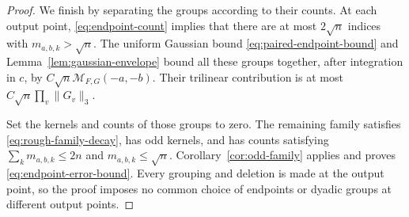 \begin{proof}
We finish by separating the groups according to their counts.
At each output point, \eqref{eq:endpoint-count} implies that there
are at most $2\sqrt n$ indices with $m_{a,b,k}>\sqrt n$.
The uniform Gaussian bound \eqref{eq:paired-endpoint-bound} and
Lemma~\ref{lem:gaussian-envelope} bound all these groups together,
after integration in $c$, by
$C\sqrt n\mathcal M_{F,G}(-a,-b)$.
Their trilinear contribution is at most
$C\sqrt n\prod_v\|G_v\|_3$.

Set the kernels and counts of those groups to zero.  The remaining
family satisfies \eqref{eq:rough-family-decay}, has odd kernels,
and has counts satisfying
$\sum_km_{a,b,k}\le2n$ and $m_{a,b,k}\le\sqrt n$.
Corollary~\ref{cor:odd-family} applies and proves
\eqref{eq:endpoint-error-bound}.  Every grouping and deletion is made
at the output point, so the proof imposes no common choice of
endpoints or dyadic groups at different output points.
\end{proof}
